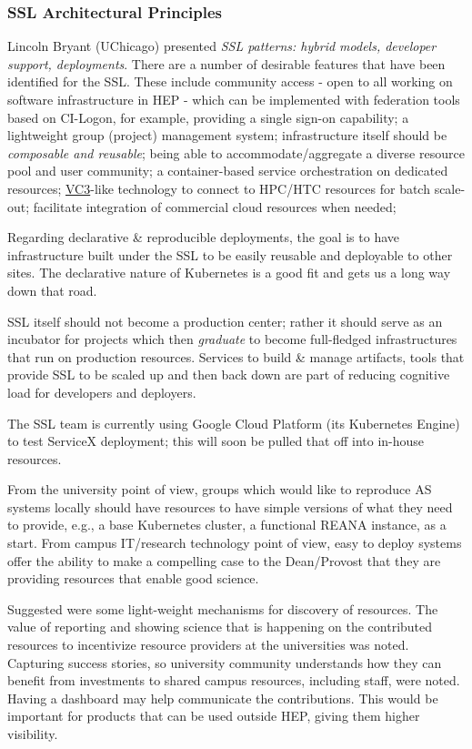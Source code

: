 \documentclass[11pt,letterpaper,fleqn]{article}
\begin{document}
\subsubsection{SSL Architectural Principles}
Lincoln Bryant (UChicago) presented {\it SSL patterns: hybrid models, developer support, deployments}.  There are a number of desirable features that have been identified for the SSL.  These include community access - open to all working on software infrastructure in HEP - which can be implemented with federation tools based on CI-Logon, for example, providing a single sign-on capability; a lightweight group (project) management system; infrastructure itself should be {\it composable and reusable}; being able to accommodate/aggregate a diverse resource pool and user community; a container-based service orchestration on dedicated resources; \href{http://www.virtualclusters.org/}{VC3}-like technology to connect to HPC/HTC resources for batch scale-out; facilitate integration of commercial cloud resources when needed;

Regarding declarative \& reproducible deployments, the goal is to have infrastructure built under the SSL to be easily reusable and deployable to other sites. The
declarative nature of Kubernetes is a good fit and gets us a long way down that road.

SSL itself should not become a production center; rather it should serve as an incubator for projects which then {\it graduate} to become full-fledged infrastructures that run on production resources. Services to build \& manage artifacts, tools that provide SSL to be scaled up and then back down are part of reducing cognitive load for developers and deployers.

The SSL team is currently using Google Cloud Platform (its Kubernetes Engine) to test ServiceX deployment; this will soon be pulled that off into in-house resources.

From the university point of view, groups which would like to reproduce AS systems locally should have resources to have simple versions of what they need to provide, e.g., a base Kubernetes cluster, a functional REANA instance, as a start.  From campus IT/research technology point of view, easy to deploy systems offer the ability to make a compelling case to the Dean/Provost that they are providing resources that enable good science.


Suggested were some light-weight mechanisms for discovery of resources.   The value of reporting and showing science that is happening on the contributed resources to incentivize resource providers at the universities was noted.  Capturing success stories, so university community understands how they can benefit from investments to shared campus resources, including staff, were noted.  Having a dashboard may help communicate the contributions.  This would be important for products that can be used outside HEP, giving them higher visibility.
\end{document}

